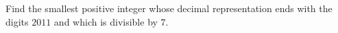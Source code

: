 Find the smallest positive integer whose decimal representation ends with the digits $2011$ and which is divisible by $7$.
